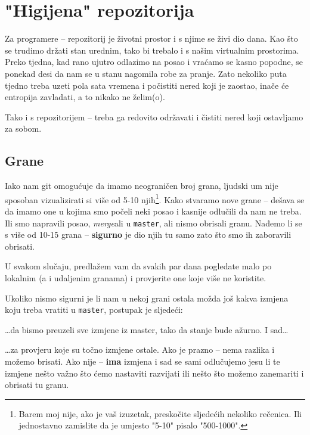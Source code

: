 \chapter*{"Higijena" repozitorija}

Za programere -- repozitorij je životni prostor i s njime se živi dio dana.
Kao što se trudimo držati stan urednim, tako bi trebalo i s našim virtualnim prostorima.
Preko tjedna, kad rano ujutro odlazimo na posao i vraćamo se kasno popodne, se ponekad desi da nam se u stanu nagomila robe za pranje.
Zato nekoliko puta tjedno treba uzeti pola sata vremena i počistiti nered koji je zaostao, inače će entropija zavladati, a to nikako ne želim(o).

Tako i s repozitorijem -- treba ga redovito održavati i čistiti nered koji ostavljamo za sobom.

\section*{Grane}

Iako nam git omogućuje da imamo neograničen broj grana, ljudski um nije sposoban vizualizirati si više od 5-10 njih\footnote{Barem moj nije, ako je vaš izuzetak, preskočite sljedećih nekoliko rečenica. Ili jednostavno zamislite da je umjesto "5-10" pisalo "500-1000".}.
Kako stvaramo nove grane -- dešava se da imamo one u kojima smo počeli neki posao i kasnije odlučili da nam ne treba.
Ili smo napravili posao, \emph{merge}ali u \verb+master+, ali nismo obrisali granu.
Nađemo li se s više od 10-15 grana -- \textbf{sigurno} je dio njih tu samo zato što smo ih zaboravili obrisati.

U svakom slučaju, predlažem vam da svakih par dana pogledate malo po lokalnim (a i udaljenim granama) i provjerite one koje više ne koristite.

Ukoliko nismo sigurni je li nam u nekoj grani ostala možda još kakva izmjena koju treba vratiti u \verb+master+, postupak je sljedeći:


\dots{}da bismo preuzeli sve izmjene iz master, tako da stanje bude ažurno.
I sad\dots


\dots{}za provjeru koje su točno izmjene ostale.
Ako je prazno -- nema razlika i možemo brisati.
Ako nije -- \textbf{ima} izmjena i sad se sami odlučujemo jesu li te izmjene nešto važno što ćemo nastaviti razvijati ili nešto što možemo zanemariti i obrisati tu granu.

